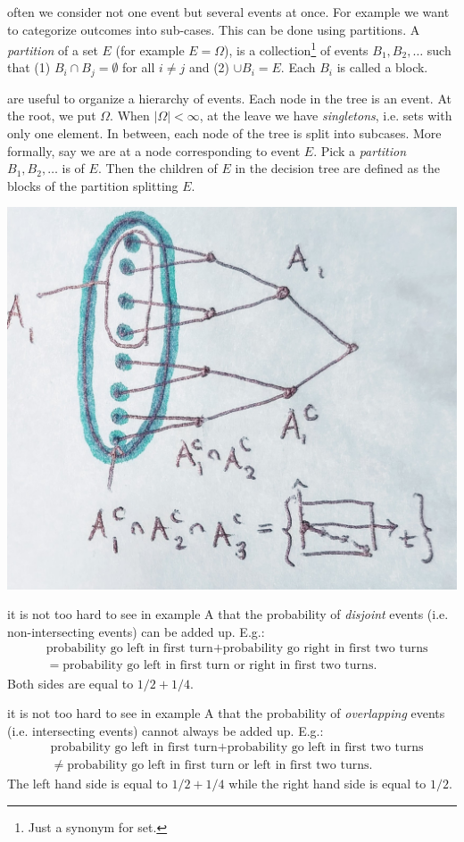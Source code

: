 \documentclass{article}
\begin{document}
 often we consider not one event but several events at once. For example we want to categorize outcomes into sub-cases. This can be done using partitions. A \emph{partition} of a set $E$ (for example $E = \Omega$), is a collection\footnote{Just a synonym for set.} of events $B_1, B_2, \dots$ such that (1) $B_i \cap B_j = \emptyset$ for all $i \neq j$ and (2) $\cup B_i = E$. Each $B_i$ is called a block.

 are useful to organize a hierarchy of events. Each node in the tree is an event. At the root, we put $\Omega$. When $|\Omega| < \infty$, at the leave we have \emph{singletons}, i.e. sets with only one element. In between, each node of the tree is split into subcases. More formally, say we are at a node corresponding to event $E$. Pick a \emph{partition} $B_1, B_2, \dots$ is of $E$. Then the children of $E$ in the decision tree are defined as the blocks of the partition splitting $E$.
\begin{center}
	\includegraphics[width=0.5\linewidth]{figures/decision-tree}
\end{center}

 it is not too hard to see in example A that the probability of \emph{disjoint} events (i.e. non-intersecting events) can be added up. E.g.:
\begin{align*} 
&\text{probability go left in first turn} + \text{probability go right in first two turns} \\ 
&= \text{probability go left in first turn or right in first two turns}. 
\end{align*} 
Both sides are equal to $1/2 + 1/4$.

 it is not too hard to see in example A that the probability of \emph{overlapping} events (i.e. intersecting events) cannot always be added up. E.g.:
\begin{align*} 
	&\text{probability go left in first turn} + \text{probability go left in first two turns} \\
	&\neq \text{probability go left in first turn or left in first two turns}.
\end{align*}
The left hand side is equal to $1/2 + 1/4$ while the right hand side is equal to $1/2$. 
\end{document}
